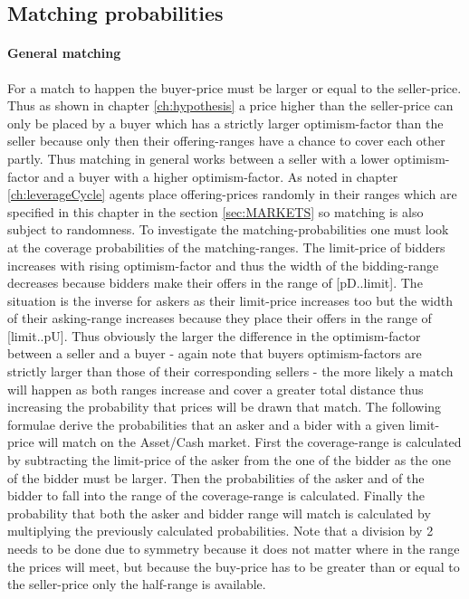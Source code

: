 \documentclass[Bachelorarbeit.tex]{subfiles}
\begin{document}
\subsection{Matching probabilities}

\paragraph{General matching}
For a match to happen the buyer-price must be larger or equal to the seller-price. Thus as shown in chapter \ref{ch:hypothesis} a price higher than the seller-price can only be placed by a buyer which has a strictly larger optimism-factor than the seller because only then their offering-ranges have a chance to cover each other partly. Thus matching in general works between a seller with a lower optimism-factor and a buyer with a higher optimism-factor. As noted in chapter \ref{ch:leverageCycle} agents place offering-prices randomly in their ranges which are specified in this chapter in the section \ref{sec:MARKETS} so matching is also subject to randomness.
\medskip
To investigate the matching-probabilities one must look at the coverage probabilities of the matching-ranges. The limit-price of bidders increases with rising optimism-factor and thus the width of the bidding-range decreases because bidders make their offers in the range of [pD..limit]. The situation is the inverse for askers as their limit-price increases too but the width of their asking-range increases because they place their offers in the range of [limit..pU]. Thus obviously the larger the difference in the optimism-factor between a seller and a buyer - again note that buyers optimism-factors are strictly larger than those of their corresponding sellers - the more likely a match will happen as both ranges increase and cover a greater total distance thus increasing the probability that prices will be drawn that match.
\medskip
The following formulae derive the probabilities that an asker and a bider with a given limit-price will match on the Asset/Cash market. First the coverage-range is calculated by subtracting the limit-price of the asker from the one of the bidder as the one of the bidder must be larger. Then the probabilities of the asker and of the bidder to fall into the range of the coverage-range is calculated. Finally the probability that both the asker and bidder range will match is calculated by multiplying the previously calculated probabilities. Note that a division by 2 needs to be done due to symmetry because it does not matter where in the range the prices will meet, but because the buy-price has to be greater than or equal to the seller-price only the half-range is available.
\end{document}

